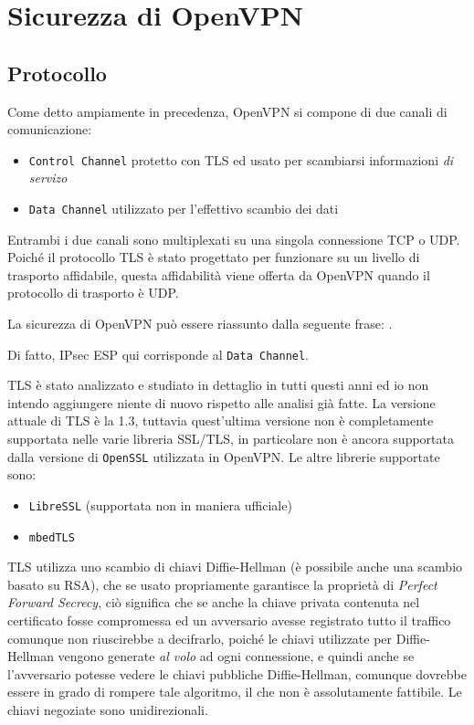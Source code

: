 \section{Sicurezza di OpenVPN}
\subsection{Protocollo}
Come detto ampiamente in precedenza, OpenVPN si compone di due canali di comunicazione:
\begin{itemize}
  \item \texttt{Control Channel} protetto con TLS ed usato per scambiarsi informazioni
  \textit{di servizo}
  \item \texttt{Data Channel} utilizzato per l'effettivo scambio dei dati
\end{itemize}
Entrambi i due canali sono multiplexati su una singola connessione TCP o UDP.
Poiché il protocollo TLS è stato progettato per funzionare su un livello di trasporto affidabile,
questa affidabilità viene offerta da OpenVPN quando il protocollo di trasporto è UDP.


La sicurezza di OpenVPN può essere riassunto dalla seguente frase:
\cite{openvpn-security-faq}.

Di fatto, IPsec ESP qui corrisponde al \texttt{Data Channel}.


TLS è stato analizzato e studiato in dettaglio in tutti questi anni ed io non intendo
aggiungere niente di nuovo rispetto alle analisi già fatte. La versione attuale
di TLS è la 1.3, tuttavia quest'ultima versione non è completamente supportata
nelle varie libreria SSL/TLS, in particolare non è ancora supportata dalla versione
di \texttt{OpenSSL} utilizzata in OpenVPN. Le altre librerie supportate sono:
\begin{itemize}
  \item \texttt{LibreSSL} (supportata non in maniera ufficiale)
  \item \texttt{mbedTLS}
\end{itemize}

TLS utilizza uno scambio di chiavi Diffie-Hellman (è possibile anche una scambio
basato su RSA), che se usato propriamente garantisce la proprietà di \textit{Perfect Forward Secrecy}, ciò
significa che se anche la chiave privata contenuta nel certificato fosse compromessa
ed un avversario avesse registrato tutto il traffico comunque non riuscirebbe a decifrarlo,
poiché le chiavi utilizzate per Diffie-Hellman vengono generate \textit{al volo} ad
ogni connessione, e quindi anche se l'avversario potesse vedere le chiavi pubbliche
Diffie-Hellman, comunque dovrebbe essere in grado di rompere tale algoritmo, il che
non è assolutamente fattibile.
Le chiavi negoziate sono unidirezionali.

